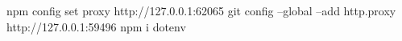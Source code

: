 npm config set proxy http://127.0.0.1:62065
git config --global --add http.proxy http://127.0.0.1:59496
npm i dotenv 